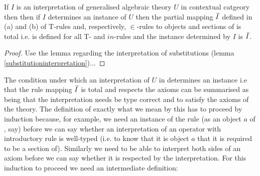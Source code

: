 \begin{lemma} 
If $I$ is an interpretation of generalised algebraic theory $U$ in contextual catgeory \catcw then then if $I$ determines an instance of $U$ then the
partial mapping $\Ibar$ defined in (a) and (b) of T-rules and, respectively, $\in$-rules to objects and sections of \catcw is total i.e. is defined for all T- and $in$-rules and the instance determined by $I$ is $\Ibar$.


\end{lemma}
\begin{proof}  
Use the lemma regarding the interpretation of substitutions (lemma \ref{substitutioninterpretation})...
\end{proof}

The condition under which an interpretation of $U$ in \catcw determines an instance i.e that the rule mapping $\Ibar$ is total and respects the axioms can be summarised as being that the interpretation needs be type correct and to satisfy the axioms of the theory. The definition of exactly what we mean by this has to proceed by induction because, for example, we need an instance of the rule
 (as an object $a$ of \catc, say) before we can say whether an interpretation of an operator with introductory rule \genericfintroductoryrule
is well-typed (i.e. to know that it is object $a$ that it is required to be a section of).
Similarly we need to be able to interpret both sides of an axiom before we can say whether it is respected
by the interpretation. For this induction to proceed we need an intermediate definition:

\def\restrict{\mathbin{\restriction}}
\newcommand{\predInstance}{\overline{I \restrict U_p}}
\newcommand{\Uincrement}{U \setminus\kern-2pt U_p}

